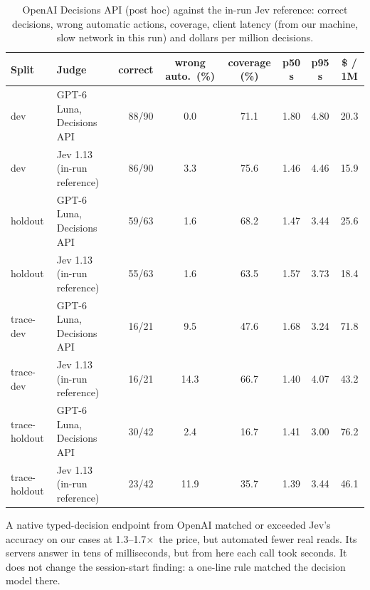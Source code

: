\documentclass[11pt,letterpaper]{article}
\newcommand{\X}{\ensuremath{\times}}
\newcommand{\OaPriceXHi}{1.7}
\newcommand{\OaPriceXLo}{1.3}
\begin{document}
\begin{table}[htbp]\centering\footnotesize\setlength\tabcolsep{4pt}
\caption{OpenAI Decisions API (post hoc) against the in-run Jev reference: correct decisions, wrong automatic actions,
coverage, client latency (from our machine, slow network in this run) and dollars per million decisions.}\label{tab:openai}
\begin{tabular*}{\textwidth}{@{\extracolsep{\fill}}l l r S[table-format=2.1] S[table-format=2.1] S[table-format=1.2] S[table-format=1.2] S[table-format=2.1]@{}}
\toprule
Split & Judge & correct & {wrong auto.\ (\%)} & {coverage (\%)} & {p50 s} & {p95 s} & {\$ / 1M} \\
\midrule
dev & GPT-6 Luna, Decisions API & 88/90 & 0.0 & 71.1 & 1.80 & 4.80 & 20.3 \\
dev & Jev 1.13 (in-run reference) & 86/90 & 3.3 & 75.6 & 1.46 & 4.46 & 15.9 \\
\addlinespace[2pt]
holdout & GPT-6 Luna, Decisions API & 59/63 & 1.6 & 68.2 & 1.47 & 3.44 & 25.6 \\
holdout & Jev 1.13 (in-run reference) & 55/63 & 1.6 & 63.5 & 1.57 & 3.73 & 18.4 \\
\addlinespace[2pt]
trace-dev & GPT-6 Luna, Decisions API & 16/21 & 9.5 & 47.6 & 1.68 & 3.24 & 71.8 \\
trace-dev & Jev 1.13 (in-run reference) & 16/21 & 14.3 & 66.7 & 1.40 & 4.07 & 43.2 \\
\addlinespace[2pt]
trace-holdout & GPT-6 Luna, Decisions API & 30/42 & 2.4 & 16.7 & 1.41 & 3.00 & 76.2 \\
trace-holdout & Jev 1.13 (in-run reference) & 23/42 & 11.9 & 35.7 & 1.39 & 3.44 & 46.1 \\
\bottomrule
\end{tabular*}
\end{table}
\begin{keyidea}
A native typed-decision endpoint from OpenAI matched or exceeded Jev's accuracy on our cases at \OaPriceXLo--\OaPriceXHi\X\ the price, but automated fewer real reads. Its
servers answer in tens of milliseconds, but from here each call took seconds. It does not change the session-start
finding: a one-line rule matched the decision model there.
\end{keyidea}
 
\end{document}
